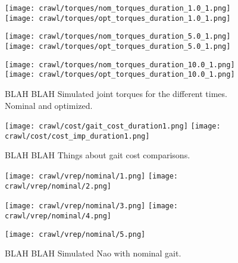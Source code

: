 \begin{figure}
  \centerline{
    \texttt{[image: crawl/torques/nom\_torques\_duration\_1.0\_1.png]}
    \texttt{[image: crawl/torques/opt\_torques\_duration\_1.0\_1.png]}
  }
  \vspace*{0.05in}
  \centerline{
    \texttt{[image: crawl/torques/nom\_torques\_duration\_5.0\_1.png]}
    \texttt{[image: crawl/torques/opt\_torques\_duration\_5.0\_1.png]}
  }
  \vspace*{0.05in}
  \centerline{
    \texttt{[image: crawl/torques/nom\_torques\_duration\_10.0\_1.png]}
    \texttt{[image: crawl/torques/opt\_torques\_duration\_10.0\_1.png]}
  }
  \vspace*{-0.05in}
  \caption{BLAH BLAH Simulated joint torques for the different times. Nominal and optimized.}
  \label{fig:vrep_joint_torques_by_duration1}
  \vspace*{-0.01in}
  \vspace*{-0.05in}
\end{figure}

\begin{figure}
  \texttt{[image: crawl/cost/gait\_cost\_duration1.png]}
  \texttt{[image: crawl/cost/cost\_imp\_duration1.png]}
  \vspace*{-0.05in}
  \caption{BLAH BLAH Things about gait cost comparisons.}
  \label{fig:cost_duration1}
  \vspace*{-0.01in}
  \vspace*{-0.05in}
\end{figure}

\begin{figure}
  \centerline{
    \texttt{[image: crawl/vrep/nominal/1.png]}
    \texttt{[image: crawl/vrep/nominal/2.png]}
  }
  \vspace*{0.05in}
  \centerline{
    \texttt{[image: crawl/vrep/nominal/3.png]}
    \texttt{[image: crawl/vrep/nominal/4.png]}
  }
  \vspace*{0.05in}
  \centerline{
    \texttt{[image: crawl/vrep/nominal/5.png]}
  }
  \vspace*{-0.05in}
  \caption{BLAH BLAH Simulated Nao with nominal gait.}
  \label{fig:vrep_nao_nom_gait1}
  \vspace*{-0.01in}
  \vspace*{-0.05in}
\end{figure}

